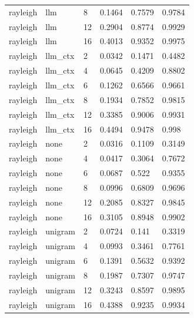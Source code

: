 \begin{tabular}{llllll}
rayleigh & llm & 8 & 0.1464 & 0.7579 & 0.9784 \\
rayleigh & llm & 12 & 0.2904 & 0.8774 & 0.9929 \\
rayleigh & llm & 16 & 0.4013 & 0.9352 & 0.9975 \\
rayleigh & llm\_ctx & 2 & 0.0342 & 0.1471 & 0.4482 \\
rayleigh & llm\_ctx & 4 & 0.0645 & 0.4209 & 0.8802 \\
rayleigh & llm\_ctx & 6 & 0.1262 & 0.6566 & 0.9661 \\
rayleigh & llm\_ctx & 8 & 0.1934 & 0.7852 & 0.9815 \\
rayleigh & llm\_ctx & 12 & 0.3385 & 0.9006 & 0.9931 \\
rayleigh & llm\_ctx & 16 & 0.4494 & 0.9478 & 0.998 \\
rayleigh & none & 2 & 0.0316 & 0.1109 & 0.3149 \\
rayleigh & none & 4 & 0.0417 & 0.3064 & 0.7672 \\
rayleigh & none & 6 & 0.0687 & 0.522 & 0.9355 \\
rayleigh & none & 8 & 0.0996 & 0.6809 & 0.9696 \\
rayleigh & none & 12 & 0.2085 & 0.8327 & 0.9845 \\
rayleigh & none & 16 & 0.3105 & 0.8948 & 0.9902 \\
rayleigh & unigram & 2 & 0.0724 & 0.141 & 0.3319 \\
rayleigh & unigram & 4 & 0.0993 & 0.3461 & 0.7761 \\
rayleigh & unigram & 6 & 0.1391 & 0.5632 & 0.9392 \\
rayleigh & unigram & 8 & 0.1987 & 0.7307 & 0.9747 \\
rayleigh & unigram & 12 & 0.3243 & 0.8597 & 0.9895 \\
rayleigh & unigram & 16 & 0.4388 & 0.9235 & 0.9934 \\
\hline
\end{tabular}
